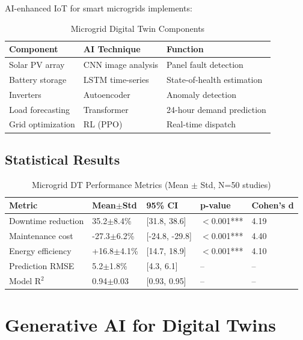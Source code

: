 \documentclass[12pt,a4paper]{article}
\begin{document}
AI-enhanced IoT for smart microgrids implements:

\begin{table}[H]
\centering
\caption{Microgrid Digital Twin Components}
\begin{tabular}{lll}
\toprule
\textbf{Component} & \textbf{AI Technique} & \textbf{Function} \\
\midrule
Solar PV array & CNN image analysis & Panel fault detection \\
Battery storage & LSTM time-series & State-of-health estimation \\
Inverters & Autoencoder & Anomaly detection \\
Load forecasting & Transformer & 24-hour demand prediction \\
Grid optimization & RL (PPO) & Real-time dispatch \\
\bottomrule
\end{tabular}
\end{table}

\subsection{Statistical Results}

\begin{table}[H]
\centering
\caption{Microgrid DT Performance Metrics (Mean $\pm$ Std, N=50 studies)}
\begin{tabular}{lllll}
\toprule
\textbf{Metric} & \textbf{Mean$\pm$Std} & \textbf{95\% CI} & \textbf{p-value} & \textbf{Cohen's d} \\
\midrule
Downtime reduction & 35.2$\pm$8.4\% & [31.8, 38.6] & $<$0.001*** & 4.19 \\
Maintenance cost & -27.3$\pm$6.2\% & [-24.8, -29.8] & $<$0.001*** & 4.40 \\
Energy efficiency & +16.8$\pm$4.1\% & [14.7, 18.9] & $<$0.001*** & 4.10 \\
Prediction RMSE & 5.2$\pm$1.8\% & [4.3, 6.1] & -- & -- \\
Model R$^2$ & 0.94$\pm$0.03 & [0.93, 0.95] & -- & -- \\
\bottomrule
\end{tabular}
\end{table}

\section{Generative AI for Digital Twins}
\end{document}
